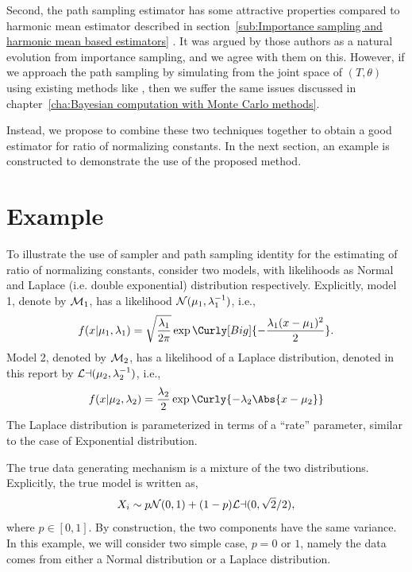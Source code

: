 Second, the path sampling estimator has some attractive properties compared to
harmonic mean estimator described in section~\ref{sub:Importance sampling and
  harmonic mean based estimators} \parencite[see][]{Gelman1998}. It was argued
by those authors as a natural evolution from importance sampling, and we agree
with them on this. However, if we approach the path sampling by simulating
from the joint space of $(T,\theta)$ using existing methods like \mcmc, then
we suffer the same issues discussed in chapter~\ref{cha:Bayesian computation
  with Monte Carlo methods}.

Instead, we propose to combine these two techniques together to obtain a good
estimator for ratio of normalizing constants. In the next section, an example
is constructed to demonstrate the use of the proposed method.

\section{Example}
\label{sec:Example}

To illustrate the use of \smc sampler and path sampling identity for the
estimating of ratio of normalizing constants, consider two models, with
likelihoods as Normal and Laplace (i.e. double exponential) distribution
respectively. Explicitly, model 1, denote by
$\mathcal{M}_1$, has a likelihood
$\mathcal{N}(\mu_1,\lambda_1^{-1})$, i.e.,
\begin{equation}
  f(x|\mu_1,\lambda_1) = \sqrt{\frac{\lambda_1}{2\pi}}
  \exp\Curly[Big]{-\frac{\lambda_1(x-\mu_1)^2}{2}}.
\end{equation}
Model 2, denoted by $\mathcal{M}_2$, has a likelihood of a Laplace distribution,
denoted in this report by $\mathcal{La}(\mu_2,\lambda_2^{-1})$, i.e.,
\begin{equation}
  f(x|\mu_2,\lambda_2) = \frac{\lambda_2}{2}
  \exp\Curly{-\lambda_2\Abs{x - \mu_2}}
\end{equation}
The Laplace distribution is parameterized in terms of a ``rate'' parameter,
similar to the case of Exponential distribution.

The true data generating mechanism is a mixture of the two distributions.
Explicitly, the true model is written as,
\begin{equation}
  X_i \sim p\mathcal{N}(0,1) + (1-p)\mathcal{La}(0, \sqrt{2}/2),
  \label{eq:data_density}
\end{equation}
where $p\in[0,1]$. By construction, the two components have the same variance.
In this example, we will consider two simple case, $p = 0$ or $1$, namely the
data comes from either a Normal distribution or a Laplace distribution.

